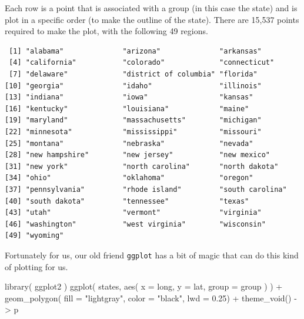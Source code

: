 \documentclass[
  letterpaper,
]{book}
\newenvironment{Shaded}{\begin{snugshade}}{\end{snugshade}}
\newcommand{\AttributeTok}[1]{\textcolor[rgb]{0.40,0.45,0.13}{#1}}
\newcommand{\FloatTok}[1]{\textcolor[rgb]{0.68,0.00,0.00}{#1}}
\newcommand{\FunctionTok}[1]{\textcolor[rgb]{0.28,0.35,0.67}{#1}}
\newcommand{\NormalTok}[1]{\textcolor[rgb]{0.00,0.23,0.31}{#1}}
\newcommand{\OtherTok}[1]{\textcolor[rgb]{0.00,0.23,0.31}{#1}}
\newcommand{\SpecialCharTok}[1]{\textcolor[rgb]{0.37,0.37,0.37}{#1}}
\newcommand{\StringTok}[1]{\textcolor[rgb]{0.13,0.47,0.30}{#1}}
\begin{document}
Each row is a point that is associated with a group (in this case the
state) and is plot in a specific order (to make the outline of the
state). There are 15,537 points required to make the plot, with the
following 49 regions.

\begin{Shaded}
\end{Shaded}

\begin{verbatim}
 [1] "alabama"              "arizona"              "arkansas"            
 [4] "california"           "colorado"             "connecticut"         
 [7] "delaware"             "district of columbia" "florida"             
[10] "georgia"              "idaho"                "illinois"            
[13] "indiana"              "iowa"                 "kansas"              
[16] "kentucky"             "louisiana"            "maine"               
[19] "maryland"             "massachusetts"        "michigan"            
[22] "minnesota"            "mississippi"          "missouri"            
[25] "montana"              "nebraska"             "nevada"              
[28] "new hampshire"        "new jersey"           "new mexico"          
[31] "new york"             "north carolina"       "north dakota"        
[34] "ohio"                 "oklahoma"             "oregon"              
[37] "pennsylvania"         "rhode island"         "south carolina"      
[40] "south dakota"         "tennessee"            "texas"               
[43] "utah"                 "vermont"              "virginia"            
[46] "washington"           "west virginia"        "wisconsin"           
[49] "wyoming"             
\end{verbatim}

Fortunately for us, our old friend \texttt{ggplot} has a bit of magic
that can do this kind of plotting for us.

\begin{Shaded}
\begin{Highlighting}[]
\FunctionTok{library}\NormalTok{( ggplot2 )}
\FunctionTok{ggplot}\NormalTok{( states, }\FunctionTok{aes}\NormalTok{( }\AttributeTok{x =}\NormalTok{ long, }
                     \AttributeTok{y =}\NormalTok{ lat,}
                     \AttributeTok{group =}\NormalTok{ group ) ) }\SpecialCharTok{+} 
  \FunctionTok{geom\_polygon}\NormalTok{( }\AttributeTok{fill =} \StringTok{"lightgray"}\NormalTok{, }
                \AttributeTok{color =} \StringTok{"black"}\NormalTok{, }
                \AttributeTok{lwd =} \FloatTok{0.25}\NormalTok{) }\SpecialCharTok{+} 
  \FunctionTok{theme\_void}\NormalTok{() }\OtherTok{{-}\textgreater{}}\NormalTok{ p}
\end{Highlighting}
\end{Shaded}
\end{document}
